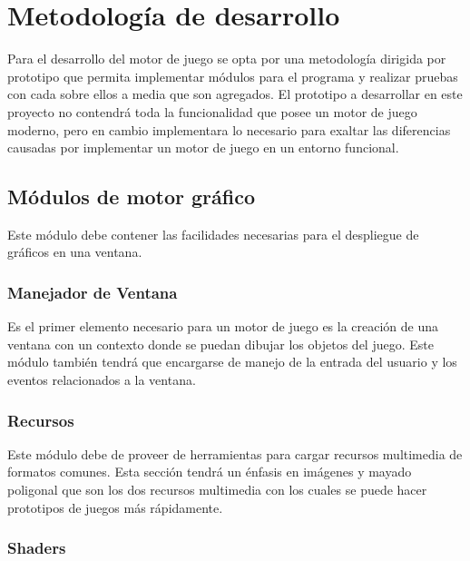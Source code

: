 
\chapter{Metodología de desarrollo}  %

\ifpdf
    \graphicspath{{metodologia/Figs/Raster/}{metodologia/Figs/PDF/}{metodologia/Figs/}}
\else
    \graphicspath{{metodologia/Figs/Vector/}{metodologia/Figs/}}
\fi

Para el desarrollo del motor de juego se opta por una metodología dirigida por prototipo que permita implementar módulos para el programa y realizar pruebas con cada sobre ellos a media que son agregados. El prototipo a desarrollar en este proyecto no contendrá toda la funcionalidad que posee un motor de juego moderno, pero en cambio implementara lo necesario para exaltar las diferencias causadas por implementar un motor de juego en un entorno funcional.

\section{Módulos de motor gráfico}

Este módulo debe contener las facilidades necesarias para el despliegue de gráficos en una ventana.

\subsection{Manejador de Ventana}

Es el primer elemento necesario para un motor de juego es la creación de una ventana con un contexto donde se puedan dibujar los objetos del juego. Este módulo también tendrá que encargarse de manejo de la entrada del usuario y los eventos relacionados a la ventana.

\subsection{Recursos}

Este módulo debe de proveer de herramientas para cargar recursos multimedia de formatos comunes. Esta sección tendrá un énfasis en imágenes y mayado poligonal que son los dos recursos multimedia con los cuales se puede hacer prototipos de juegos más rápidamente.

\subsection{Shaders}

